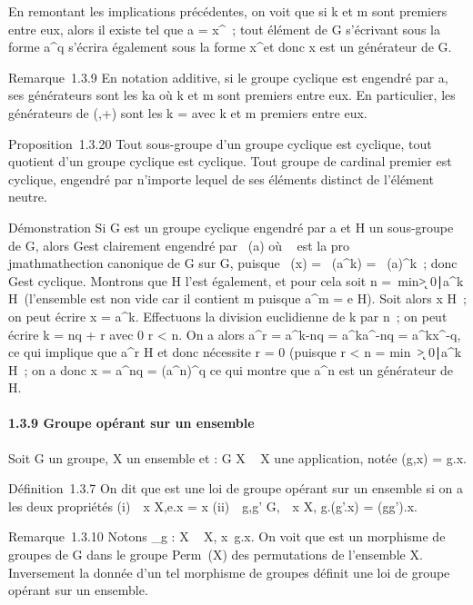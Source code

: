 En remontant les implications précédentes, on voit que si k et m sont
premiers entre eux, alors il existe \ell tel que a = x^\ell~; tout
élément de G s'écrivant sous la forme a^q s'écrira également
sous la forme x^\ellq et donc x est un générateur de G.

Remarque~1.3.9 En notation additive, si le groupe cyclique est engendré
par a, ses générateurs sont les ka où k et m sont premiers entre eux. En
particulier, les générateurs de (\diagupm{},+) sont les
k = \overlinek avec k et
m premiers entre eux.

Proposition~1.3.20 Tout sous-groupe d'un groupe cyclique est cyclique,
tout quotient d'un groupe cyclique est cyclique. Tout groupe de cardinal
premier est cyclique, engendré par n'importe lequel de ses éléments
distinct de l'élément neutre.

Démonstration Si G est un groupe cyclique engendré par a et H un
sous-groupe de G, alors G\diagupH est clairement engendré par \pi~(a) où \pi~ est la
pro\\jmathmathection canonique de G sur G\diagupH, puisque \pi~(x) = \pi~(a^k) =
\pi~(a)^k~; donc G\diagupH est cyclique. Montrons que H l'est
également, et pour cela soit n =\
min\k \textgreater{}
0∣a^k \in H\
(l'ensemble est non vide car il contient m puisque a^m = e \in
H). Soit alors x \in H~; on peut écrire x = a^k. Effectuons la
division euclidienne de k par n~; on peut écrire k = nq + r avec 0 \leq r
\textless{} n. On a alors a^r = a^k-nq =
a^ka^-nq = a^kx^-q, ce qui
implique que a^r \in H et donc nécessite r = 0 (puisque r
\textless{} n = min~\k
\textgreater{} 0∣a^k \in
H\)~; on a donc x = a^nq =
(a^n)^q ce qui montre que a^n est un
générateur de H.

\paragraph{1.3.9 Groupe opérant sur un ensemble}

Soit G un groupe, X un ensemble et \phi : G \times X \rightarrow~ X une application, notée
\phi(g,x) = g.x.

Définition~1.3.7 On dit que \phi est une loi de groupe opérant sur un
ensemble si on a les deux propriétés (i)\forall~~x \in
X,e.x = x (ii)\forall~~g,g' \in
G,\forall~~x \in X, g.(g'.x) = (gg').x.

Remarque~1.3.10 Notons \sigma_g : X \rightarrow~ X,
x\mapsto~g.x. On voit que \sigma est un morphisme de
groupes de G dans le groupe Perm~(X) des
permutations de l'ensemble X. Inversement la donnée d'un tel morphisme
de groupes définit une loi de groupe opérant sur un ensemble.

